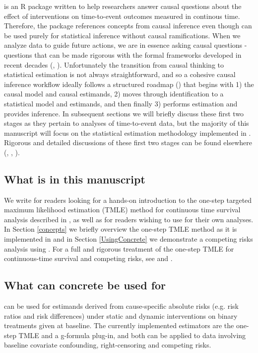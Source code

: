 \documentclass{report}
\newcommand{\1}{\ensuremath{\mathbf{1}}}
\begin{document}
 is an R package written to help researchers answer causal questions about the effect of interventions on time-to-event outcomes measured in continous time. Therefore, the package references concepts from causal inference even though  can be used purely for statistical inference without causal ramifications. When we analyze data to guide future actions, we are in essence asking causal questions - questions that can be made rigorous with the formal frameworks developed in recent decades (\cite{pearl_causal_2016}, \cite{holland_statistics_1986}). Unfortunately the transition from causal thinking to statistical estimation is not always straightforward, and so a cohesive causal inference workflow ideally follows a structured roadmap (\cite{petersen_causal_2014}) that begins with 1) the causal model and causal estimands, 2) moves through identification to a statistical model and estimands, and then finally 3) performs estimation and provides inference. In subsequent sections we will briefly discuss these first two stages as they pertain to analyses of time-to-event data, but the majority of this manuscript will focus on the statistical estimation methodology implemented in . Rigorous and detailed discussions of these first two stages can be found elsewhere (\cite{laan_targeted_2011}, \cite{laan_targeted_2018}, \cite{rytgaard_continuous-time_2021}).

\subsection{What is in this manuscript}
\label{sec:orga384eb6}
We write for readers looking for a hands-on introduction to the one-step targeted maximum likelihood estimation (TMLE) method for continuous time survival analysis described in \cite{rytgaard_one-step_2021}, as well as for readers
wishing to use  for their own analyses. In Section \ref{concepts} we briefly overview the one-step TMLE method as it is implemented in  and in Section \ref{UsingConcrete} we demonstrate a competing risks analysis using . For a full and rigorous treatment of the one-step TMLE for continuous-time survival and competing risks, see \cite{rytgaard_one-step_2021} and \cite{rytgaard_continuous-time_2021}.

\subsection{What can concrete be used for}
\label{sec:orgeb349fd}
 can be used for estimands derived from cause-specific absolute risks (e.g. risk ratios and risk differences) under static and dynamic interventions on binary treatments given at baseline. The currently implemented estimators are the one-step TMLE and a g-formula plug-in, and both can be applied to data involving baseline covariate confounding, right-censoring and competing risks. 
\end{document}
